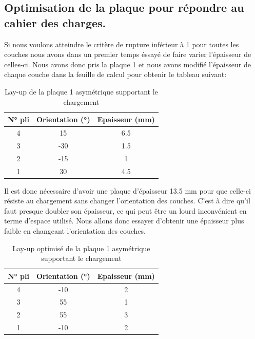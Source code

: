 \documentclass[a4paper,12pt]{article}
\begin{document}
\subsection {Optimisation de la plaque pour répondre au cahier des charges.}
Si nous voulons atteindre le critère de rupture inférieur à 1 pour toutes les couches nous avons dans un premier temps éssayé de faire varier l'épaisseur de celles-ci. Nous avons donc pris la plaque 1 et nous avons modifié l'épaisseur de chaque couche dans la feuille de calcul pour obtenir le tableau suivant:

\begin{table}[h!]
	\renewcommand{\arraystretch}{1.2} %
	\centering
	\begin{tabular}{c|c|c}
		\textbf{N° pli} & \textbf{Orientation (°)} & \textbf{Epaisseur (mm)} \\
		\hline
		4         & 15              & 6.5           \\
		3          & -30              & 1.5           \\
		2          & -15              & 1          \\
		1         & 30             & 4.5         \\
	\end{tabular}
	\caption{Lay-up de la plaque 1 asymétrique supportant le chargement}
	\label{tab:lay up opti epaisseur}
\end{table}

Il est donc nécessaire d'avoir une plaque d'épaisseur 13.5 mm pour que celle-ci résiste au chargement sans changer l'orientation des couches. C'est à dire qu'il faut presque doubler son épaisseur, ce qui peut être un lourd inconvénient en terme d'espace utilisé. Nous allons donc essayer d'obtenir une épaisseur plus faible en changeant l'orientation des couches. 



\begin{table}[H]
	\renewcommand{\arraystretch}{1.2} %
	\centering
	\begin{tabular}{c|c|c}
		\textbf{N° pli} & \textbf{Orientation (°)} & \textbf{Epaisseur (mm)} \\
		\hline
		4         & -10              & 2           \\
		3          & 55              & 1           \\
		2          & 55            & 3          \\
		1         & -10             & 2        \\
	\end{tabular}
	\caption{Lay-up optimisé de la plaque 1 asymétrique supportant le chargement}
	\label{tab:lay up opti epaisseur orientation}
\end{table}
\end{document}
